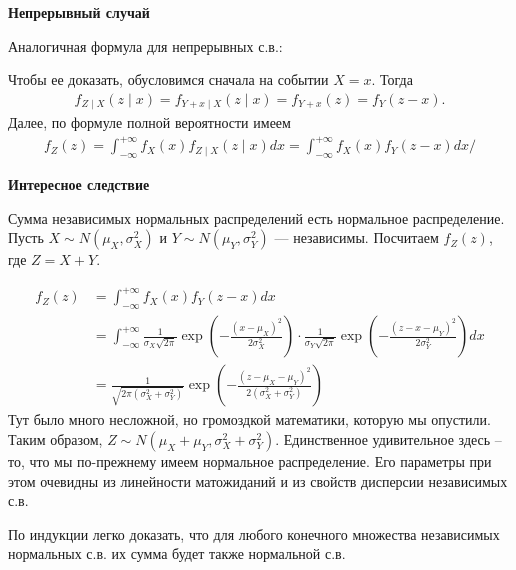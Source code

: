 \documentclass[12pt]{article}
\begin{document}
\textbf{Непрерывный случай}

Аналогичная формула для непрерывных с.в.:
\begin{center}
\end{center}
Чтобы ее доказать, обусловимся сначала на событии $X = x$. Тогда 
\begin{align*}
  f_{Z \mid X}(z \mid x) = f_{Y + x \mid X}(z \mid x) = f_{Y + x}(z) = f_Y(z - x). 
\end{align*}
Далее, по формуле полной вероятности имеем
\begin{align*}
  f_Z(z) = \int_{-\infty}^{+\infty} f_X(x) f_{Z \mid X} (z \mid x) dx = \int_{-\infty}^{+\infty} f_X(x) f_Y(z - x) dx/
\end{align*}

\textbf{Интересное следствие}

Сумма независимых нормальных распределений есть нормальное распределение. Пусть $X \sim N(\mu_X, \sigma_X^2)$ и $Y \sim N(\mu_Y, \sigma_Y^2)$ --- независимы. Посчитаем $f_Z(z)$, где $Z = X + Y$.

\begin{align*}
  f_Z(z) &= \int_{-\infty}^{+\infty} f_X(x) f_Y(z - x) dx \\
         &= \int_{-\infty}^{+\infty} \frac{1}{\sigma_X \sqrt{2\pi}} \exp\left(-\frac{(x - \mu_X)^2}{2\sigma_X^2}\right) \cdot \frac{1}{\sigma_Y \sqrt{2\pi}} \exp\left(-\frac{(z - x - \mu_Y)^2}{2\sigma_Y^2}\right)dx \\
         &= \frac{1}{\sqrt{2\pi(\sigma_X^2 + \sigma_Y^2)}} \exp\left(-\frac{(z - \mu_X - \mu_Y)^2}{2(\sigma_X^2 + \sigma_Y^2)}\right)
\end{align*}
Тут было много несложной, но громоздкой математики, которую мы опустили. Таким образом, $Z \sim N(\mu_X + \mu_Y, \sigma_X^2 + \sigma_Y^2)$. Единственное удивительное здесь -- то, что мы по-прежнему имеем нормальное распределение. Его параметры при этом очевидны из линейности матожиданий и из свойств дисперсии независимых с.в. 

По индукции легко доказать, что для любого конечного множества независимых нормальных с.в. их сумма будет также нормальной с.в.
\end{document}
